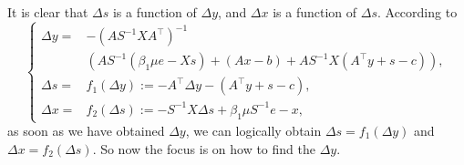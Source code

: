 It is clear that $\Delta s$ is a function of $\Delta y$, and $\Delta x$ is a function of $\Delta s$. According to 
$$
\left\{
\begin{aligned}
\Delta y= 
& -\left(A S^{-1} X A^{\top}\right)^{-1} \\
& \left(A S^{-1}\left(\beta_1\mu e-X s\right)+\left(A x-b\right)+A S^{-1} X\left(A^{\top} y+s-c\right)\right), \\
\Delta s = &f_1(\Delta y) := -A^{\top} \Delta y-\left(A^{\top} y+s-c\right), \\
\Delta x = &f_2(\Delta s) := -S^{-1} X \Delta s+\beta_1\mu S^{-1} e-x,
\end{aligned}
\right.
$$
as soon as we have obtained $\Delta y$, we can logically obtain $\Delta s=f_1(\Delta y)$ and $\Delta x=f_2(\Delta s)$. So now the focus is on how to find the $\Delta y$.

